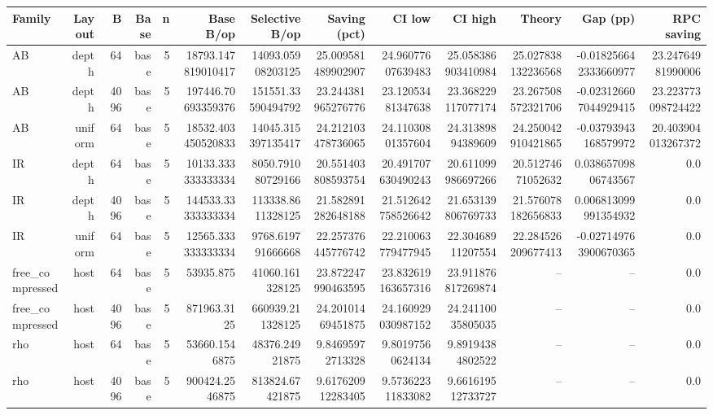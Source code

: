 \begin{tabular}{lrrrrrrrrrrrr}
\toprule
Family & Layout & B & Base & n & Base B/op & Selective B/op & Saving (pct) & CI low & CI high & Theory & Gap (pp) & RPC saving \\
\midrule
AB & depth & 64 & base & 5 & 18793.147819010417 & 14093.05908203125 & 25.009581489902907 & 24.96077607639483 & 25.058386903410984 & 25.027838132236568 & -0.018256642333660977 & 23.24764981990006 \\
AB & depth & 4096 & base & 5 & 197446.70693359376 & 151551.33590494792 & 23.244381965276776 & 23.12053481347638 & 23.368229117077174 & 23.267508572321706 & -0.023126607044929415 & 23.223773098724422 \\
AB & uniform & 64 & base & 5 & 18532.403450520833 & 14045.315397135417 & 24.212103478736065 & 24.11030801357604 & 24.31389894389609 & 24.250042910421865 & -0.03793943168579972 & 20.403904013267372 \\
IR & depth & 64 & base & 5 & 10133.333333333334 & 8050.791080729166 & 20.551403808593754 & 20.491707630490243 & 20.611099986697266 & 20.51274671052632 & 0.03865709806743567 & 0.0 \\
IR & depth & 4096 & base & 5 & 144533.33333333334 & 113338.8611328125 & 21.582891282648188 & 21.512642758526642 & 21.653139806769733 & 21.576078182656833 & 0.006813099991354932 & 0.0 \\
IR & uniform & 64 & base & 5 & 12565.333333333334 & 9768.619791666668 & 22.257376445776742 & 22.210063779477945 & 22.30468911207554 & 22.284526209677413 & -0.027149763900670365 & 0.0 \\
free\_compressed & host & 64 & base & 5 & 53935.875 & 41060.161328125 & 23.872247990463595 & 23.832619163657316 & 23.911876817269874 & -- & -- & 0.0 \\
free\_compressed & host & 4096 & base & 5 & 871963.3125 & 660939.211328125 & 24.20101469451875 & 24.160929030987152 & 24.24110035805035 & -- & -- & 0.0 \\
rho & host & 64 & base & 5 & 53660.1546875 & 48376.24921875 & 9.84695972713328 & 9.80197560624134 & 9.89194384802522 & -- & -- & 0.0 \\
rho & host & 4096 & base & 5 & 900424.2546875 & 813824.67421875 & 9.617620912283405 & 9.573622311833082 & 9.661619512733727 & -- & -- & 0.0 \\
\bottomrule
\end{tabular}
